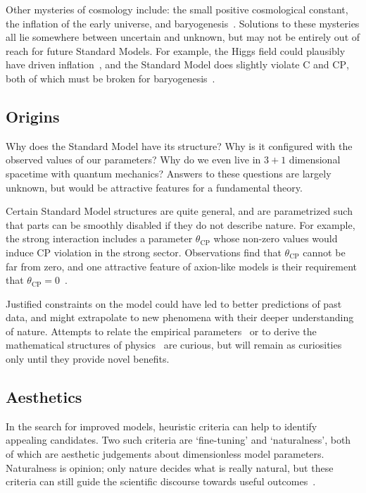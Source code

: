 Other mysteries of cosmology include:
the small positive cosmological constant,
the inflation of the early universe,
and baryogenesis~\cite{
wells2020discovery,
riess1998observational
}.
Solutions to these mysteries all lie somewhere between uncertain and unknown,
but may not be entirely out of reach for future Standard Models.
For example, the Higgs field could plausibly have driven
inflation~\cite{bezrukov2008higgs},
and the Standard Model does slightly violate $\mathrm{C}$ and $\mathrm{CP}$,
both of which must be broken for baryogenesis~\cite{sakharov1991re}.


\subsection{Origins}
Why does the Standard Model have its structure?
Why is it configured with the observed values of our parameters?
Why do we even live in $3+1$ dimensional spacetime with quantum mechanics?
Answers to these questions are largely unknown, but would be
attractive features for a fundamental theory.

Certain Standard Model structures are quite general, and are parametrized such
that parts can be smoothly disabled if they do not describe nature.
For example, the strong interaction includes a parameter $\theta_\mathrm{CP}$
whose non-zero values would induce $\mathrm{CP}$ violation in the strong
sector.
Observations find that $\theta_\mathrm{CP}$ cannot be far from zero, and one
attractive feature of axion-like models is their requirement that
$\theta_\mathrm{CP} = 0$~\cite{
kim2008axions,
thomson2013modern,
martin2017particle
}.

Justified constraints on the model could have led to better predictions of
past data, and might extrapolate to new phenomena with their deeper
understanding of nature.
Attempts to relate the empirical parameters~\cite{
sato1979ratio,
beg1982gauge,
koide1983fermion,
denterria2012gaussian
}
or to derive the mathematical structures of physics~\cite{
goyal2010origin,
skilling2021abc,
axioms1010038
}
are curious, but will remain as curiosities only until they provide novel
benefits.


\subsection{Aesthetics}
In the search for improved models, heuristic criteria can help to identify
appealing candidates.
Two such criteria are `fine-tuning' and `naturalness', both of which are
aesthetic judgements about dimensionless model parameters.
Naturalness is opinion; only nature decides what is really natural,
but these criteria can still guide the scientific discourse towards useful
outcomes~\cite{wells2020discovery}.

